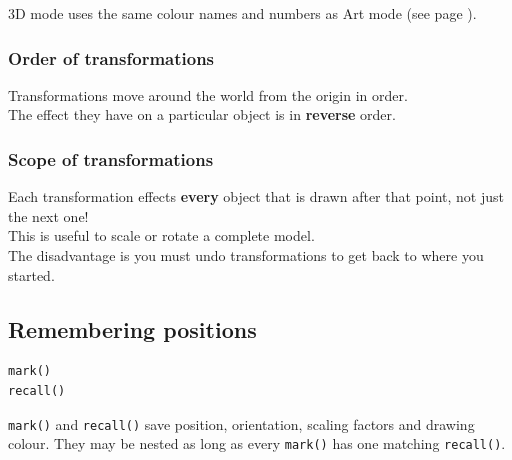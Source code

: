 \documentclass[12pt,a4paper,twoside]{article}
\renewcommand{\_}{\texttt{\symbol{95}}}
\begin{document}

3D mode uses the same colour names and numbers as Art mode (see page \pageref{roboc:colours}).
%
%
%
%

\subsubsection*{Order of transformations}

Transformations move around the world from the origin in order.\\
The effect they have on a particular object is in \textbf{reverse} order.\\

\subsubsection*{Scope of transformations}

Each transformation effects \textbf{every} object that is drawn after
that point, not just the next one!\\
This is useful to scale or rotate a complete model.\\
The disadvantage is you must undo transformations to get back to where
you started.\\

\subsection{Remembering positions}

\begin{verbatim}
mark()
recall()
\end{verbatim}

\verb^mark()^ and \verb^recall()^ save position, orientation,
scaling factors and drawing colour. They may be nested as long as
every \verb^mark()^ has one matching \verb^recall()^.\\
\end{document}
